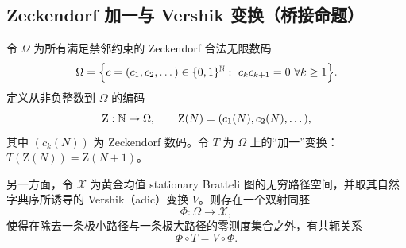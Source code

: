 \subsection{Zeckendorf 加一与 Vershik 变换（桥接命题）}

\begin{proposition}[加一同构]\label{prop:zeckendorf-vershik}
令 $\Omega$ 为所有满足禁邻约束的 Zeckendorf 合法无限数码
$$
\Omega=\Big\{c=(c_1,c_2,\dots)\in\{0,1\}^{\NN}:\ c_kc_{k+1}=0\ \forall k\ge 1\Big\}.
$$
定义从非负整数到 $\Omega$ 的编码
$$
\mathrm{Z}:\mathbb{N}\to\Omega,\qquad \mathrm{Z}(N)=(c_1(N),c_2(N),\dots),
$$
其中 $(c_k(N))$ 为 Zeckendorf 数码。令 $T$ 为 $\Omega$ 上的“加一”变换：$T(\mathrm{Z}(N))=\mathrm{Z}(N+1)$。

另一方面，令 $\mathcal{X}$ 为黄金均值 stationary Bratteli 图的无穷路径空间，并取其自然字典序所诱导的 Vershik（adic）变换 $V$。则存在一个双射同胚
$$
\Phi:\Omega\to\mathcal{X},
$$
使得在除去一条极小路径与一条极大路径的零测度集合之外，有共轭关系
$$
\Phi\circ T = V\circ \Phi.
$$
\end{proposition}

